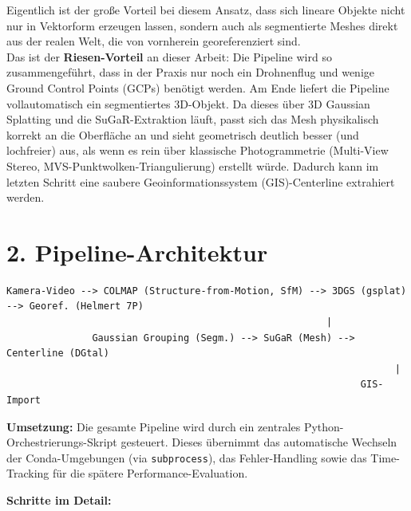 \documentclass[11pt, a4paper]{article}
\begin{document}
\begin{tcolorbox}[colback=blue!5, colframe=blue!50!black, title=\textbf{Kernbeitrag (Der Automatisierungs-Vorteil)}]
Eigentlich ist der gro\ss e Vorteil bei diesem Ansatz, dass sich lineare Objekte nicht nur in Vektorform erzeugen lassen, sondern auch als segmentierte Meshes direkt aus der realen Welt, die von vornherein georeferenziert sind. \\
Das ist der \textbf{Riesen-Vorteil} an dieser Arbeit: Die Pipeline wird so zusammengef\"uhrt, dass in der Praxis nur noch ein Drohnenflug und wenige Ground Control Points (GCPs) ben\"otigt werden. Am Ende liefert die Pipeline vollautomatisch ein segmentiertes 3D-Objekt. Da dieses \"uber 3D Gaussian Splatting und die SuGaR-Extraktion l\"auft, passt sich das Mesh physikalisch korrekt an die Oberfl\"ache an und sieht geometrisch deutlich besser (und lochfreier) aus, als wenn es rein \"uber klassische Photogrammetrie (Multi-View Stereo, MVS-Punktwolken-Triangulierung) erstellt w\"urde. Dadurch kann im letzten Schritt eine saubere Geoinformationssystem (GIS)-Centerline extrahiert werden.
\end{tcolorbox}

\section{2. Pipeline-Architektur}

\begin{lstlisting}[frame=none, backgroundcolor=\color{white}]
Kamera-Video --> COLMAP (Structure-from-Motion, SfM) --> 3DGS (gsplat) --> Georef. (Helmert 7P)
                                                        |
               Gaussian Grouping (Segm.) --> SuGaR (Mesh) --> Centerline (DGtal)
                                                                    |
                                                              GIS-Import
\end{lstlisting}

\textbf{Umsetzung:} Die gesamte Pipeline wird durch ein zentrales Python-Orchestrierungs-Skript gesteuert. Dieses \"ubernimmt das automatische Wechseln der Conda-Umgebungen (via \texttt{subprocess}), das Fehler-Handling sowie das Time-Tracking f\"ur die sp\"atere Performance-Evaluation.

\textbf{Schritte im Detail:}
\end{document}
